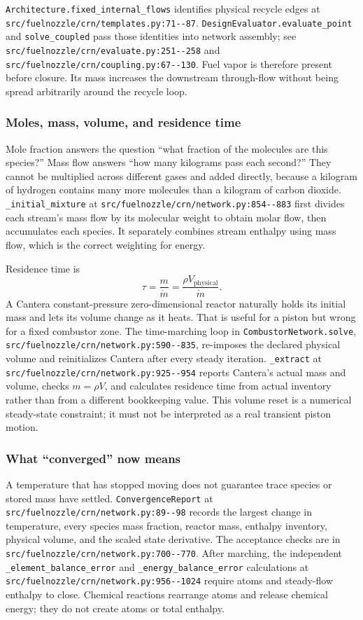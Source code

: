 \documentclass[11pt]{article}
\newcommand{\code}[1]{\nolinkurl{#1}}
\newcommand{\srcline}[2]{\nolinkurl{#1:#2}}
\begin{document}
\code{Architecture.fixed\_internal\_flows} identifies physical recycle edges at
\srcline{src/fuelnozzle/crn/templates.py}{71--87}. \code{DesignEvaluator.evaluate\_point} and
\code{solve\_coupled} pass those identities into network assembly; see
\srcline{src/fuelnozzle/crn/evaluate.py}{251--258} and
\srcline{src/fuelnozzle/crn/coupling.py}{67--130}. Fuel vapor is therefore present before
closure. Its mass increases the downstream through-flow without being spread arbitrarily
around the recycle loop.

\subsubsection{Moles, mass, volume, and residence time}

Mole fraction answers the question ``what fraction of the molecules are this species?''
Mass flow answers ``how many kilograms pass each second?'' They cannot be multiplied across
different gases and added directly, because a kilogram of hydrogen contains many more
molecules than a kilogram of carbon dioxide. \code{\_initial\_mixture} at
\srcline{src/fuelnozzle/crn/network.py}{854--883} first divides each stream's mass flow by its
molecular weight to obtain molar flow, then accumulates each species. It separately combines
stream enthalpy using mass flow, which is the correct weighting for energy.

Residence time is
\[
  \tau = \frac{m}{\dot m} = \frac{\rho V_{\mathrm{physical}}}{\dot m}.
\]
A Cantera constant-pressure zero-dimensional reactor naturally holds its initial mass and lets
its volume change as it heats. That is useful for a piston but wrong for a fixed combustor
zone. The time-marching loop in \code{CombustorNetwork.solve},
\srcline{src/fuelnozzle/crn/network.py}{590--835}, re-imposes the declared physical volume
and reinitializes Cantera after every steady iteration. \code{\_extract} at
\srcline{src/fuelnozzle/crn/network.py}{925--954} reports Cantera's actual mass and volume,
checks $m=\rho V$, and calculates residence time from actual inventory rather than from a
different bookkeeping value. This volume reset is a numerical steady-state constraint; it
must not be interpreted as a real transient piston motion.

\subsubsection{What ``converged'' now means}

A temperature that has stopped moving does not guarantee trace species or stored mass have
settled. \code{ConvergenceReport} at
\srcline{src/fuelnozzle/crn/network.py}{89--98} records the largest change in temperature,
every species mass fraction, reactor mass, enthalpy inventory, physical volume, and the scaled
state derivative. The acceptance checks are in
\srcline{src/fuelnozzle/crn/network.py}{700--770}. After marching, the independent
\code{\_element\_balance\_error} and \code{\_energy\_balance\_error} calculations at
\srcline{src/fuelnozzle/crn/network.py}{956--1024} require atoms and steady-flow enthalpy to
close. Chemical reactions rearrange atoms and release chemical energy; they do not create
atoms or total enthalpy.
\end{document}

